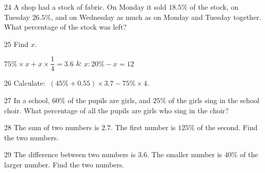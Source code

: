 \gap
\begin{probbox}{24}{\relax}
A shop had a stock of fabric. On Monday it sold $18.5\%$ of the stock, on Tuesday $26.5\%$, and on Wednesday as much as on Monday and Tuesday together. What percentage of the stock was left?
\end{probbox}
\gap
\begin{probbox}{25}{\relax}
Find $x$.
\begin{cols2}
 $75\%\times x+x\times\dfrac14=3.6$ &  $x:20\%-x=12$
\end{cols2}
\end{probbox}
\gap
\begin{probbox}{26}{\relax}
Calculate: $\ (45\%+0.55)\times3.7-75\%\times4$.
\end{probbox}
\gap
\begin{probbox}{27}{\relax}
In a school, $60\%$ of the pupils are girls, and $25\%$ of the girls sing in the school choir. What percentage of all the pupils are girls who sing in the choir?
\end{probbox}
\gap
\begin{probbox}{28}{\relax}
The sum of two numbers is $2.7$. The first number is $125\%$ of the second. Find the two numbers.
\end{probbox}
\gap
\begin{probbox}{29}{\relax}
The difference between two numbers is $3.6$. The smaller number is $40\%$ of the larger number. Find the two numbers.
\end{probbox}
